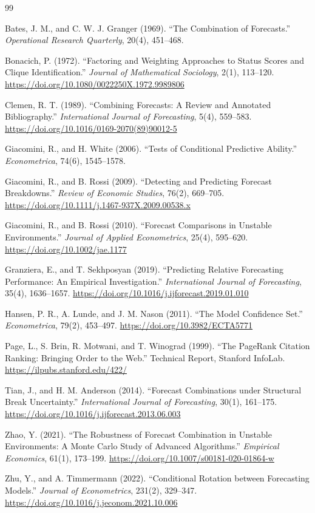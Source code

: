 \documentclass[11pt,a4paper]{article}
\begin{document}
\begin{thebibliography}{99}

Bates, J. M., and C. W. J. Granger (1969).
``The Combination of Forecasts.''
\textit{Operational Research Quarterly}, 20(4), 451--468.

Bonacich, P. (1972).
``Factoring and Weighting Approaches to Status Scores and Clique Identification.''
\textit{Journal of Mathematical Sociology}, 2(1), 113--120.
\url{https://doi.org/10.1080/0022250X.1972.9989806}

Clemen, R. T. (1989).
``Combining Forecasts: A Review and Annotated Bibliography.''
\textit{International Journal of Forecasting}, 5(4), 559--583.
\url{https://doi.org/10.1016/0169-2070(89)90012-5}

Giacomini, R., and H. White (2006).
``Tests of Conditional Predictive Ability.''
\textit{Econometrica}, 74(6), 1545--1578.

Giacomini, R., and B. Rossi (2009).
``Detecting and Predicting Forecast Breakdowns.''
\textit{Review of Economic Studies}, 76(2), 669--705.
\url{https://doi.org/10.1111/j.1467-937X.2009.00538.x}

Giacomini, R., and B. Rossi (2010).
``Forecast Comparisons in Unstable Environments.''
\textit{Journal of Applied Econometrics}, 25(4), 595--620.
\url{https://doi.org/10.1002/jae.1177}

Granziera, E., and T. Sekhposyan (2019).
``Predicting Relative Forecasting Performance: An Empirical Investigation.''
\textit{International Journal of Forecasting}, 35(4), 1636--1657.
\url{https://doi.org/10.1016/j.ijforecast.2019.01.010}

Hansen, P. R., A. Lunde, and J. M. Nason (2011).
``The Model Confidence Set.''
\textit{Econometrica}, 79(2), 453--497.
\url{https://doi.org/10.3982/ECTA5771}

Page, L., S. Brin, R. Motwani, and T. Winograd (1999).
``The PageRank Citation Ranking: Bringing Order to the Web.''
Technical Report, Stanford InfoLab.
\url{https://ilpubs.stanford.edu/422/}

Tian, J., and H. M. Anderson (2014).
``Forecast Combinations under Structural Break Uncertainty.''
\textit{International Journal of Forecasting}, 30(1), 161--175.
\url{https://doi.org/10.1016/j.ijforecast.2013.06.003}

Zhao, Y. (2021).
``The Robustness of Forecast Combination in Unstable Environments: A Monte Carlo Study of Advanced Algorithms.''
\textit{Empirical Economics}, 61(1), 173--199.
\url{https://doi.org/10.1007/s00181-020-01864-w}

Zhu, Y., and A. Timmermann (2022).
``Conditional Rotation between Forecasting Models.''
\textit{Journal of Econometrics}, 231(2), 329--347.
\url{https://doi.org/10.1016/j.jeconom.2021.10.006}

\end{thebibliography}
\end{document}
